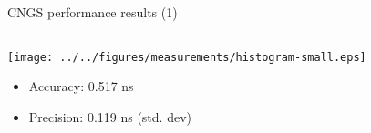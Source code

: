 \documentclass[compress,red]{beamer}
\begin{document}
\begin{frame}{CNGS performance results (1)}

  \begin{columns}[c]
	  \begin{center}

		\hspace{-1cm}
		\texttt{[image: ../../figures/measurements/histogram-small.eps]}
		\begin{itemize}
			\item Accuracy: 0.517 ns
			\item Precision: 0.119 ns (std. dev)
		\end{itemize}			



\end{center}
\end{columns}
\end{frame}
\end{document}
